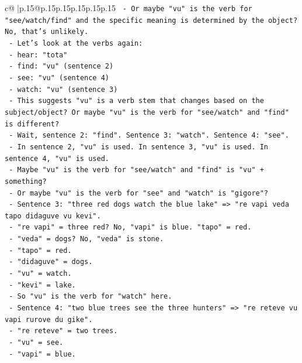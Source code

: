 \documentclass{article}
\begin{document}
{\begin{supertabular}{c@{$\;$}|p{.15\linewidth}@{}p{.15\linewidth}p{.15\linewidth}p{.15\linewidth}p{.15\linewidth}p{.15\linewidth}}
{{{\texttt{          {-} Or maybe "vu" is the verb for "see/watch/find" and the specific meaning is determined by the object? No, that's unlikely.} \\
\texttt{          {-} Let's look at the verbs again:} \\
\texttt{            {-} hear: "tota"} \\
\texttt{            {-} find: "vu" (sentence 2)} \\
\texttt{            {-} see: "vu" (sentence 4)} \\
\texttt{            {-} watch: "vu" (sentence 3)} \\
\texttt{            {-} This suggests "vu" is a verb stem that changes based on the subject/object? Or maybe "vu" is the verb for "see/watch" and "find" is different?} \\
\texttt{            {-} Wait, sentence 2: "find". Sentence 3: "watch". Sentence 4: "see".} \\
\texttt{            {-} In sentence 2, "vu" is used. In sentence 3, "vu" is used. In sentence 4, "vu" is used.} \\
\texttt{            {-} Maybe "vu" is the verb for "see/watch" and "find" is "vu" + something?} \\
\texttt{            {-} Or maybe "vu" is the verb for "see" and "watch" is "gigore"?} \\
\texttt{            {-} Sentence 3: "three red dogs watch the blue lake" => "re vapi veda tapo didaguve vu kevi".} \\
\texttt{              {-} "re vapi" = three red? No, "vapi" is blue. "tapo" = red.} \\
\texttt{              {-} "veda" = dogs? No, "veda" is stone.} \\
\texttt{              {-} "tapo" = red.} \\
\texttt{              {-} "didaguve" = dogs.} \\
\texttt{              {-} "vu" = watch.} \\
\texttt{              {-} "kevi" = lake.} \\
\texttt{              {-} So "vu" is the verb for "watch" here.} \\
\texttt{            {-} Sentence 4: "two blue trees see the three hunters" => "re reteve vu vapi rurove du gike".} \\
\texttt{              {-} "re reteve" = two trees.} \\
\texttt{              {-} "vu" = see.} \\
\texttt{              {-} "vapi" = blue.} \\
}}}
\end{supertabular}}
\end{document}
